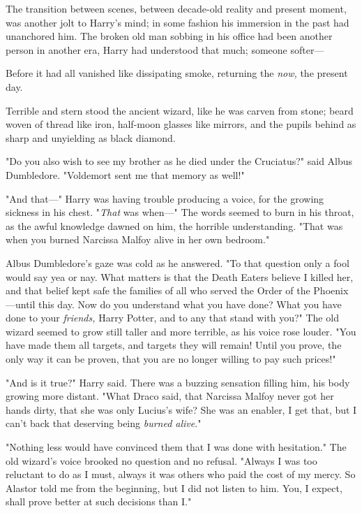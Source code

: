 The transition between scenes, between decade-old reality and present moment, 
was another jolt to Harry's mind; in some fashion his immersion in the past had 
unanchored him. The broken old man sobbing in his office had been another 
person in another era, Harry had understood that much; someone softer---

Before it had all vanished like dissipating smoke, returning the \emph{now,} 
the present day.

Terrible and stern stood the ancient wizard, like he was carven from stone; 
beard woven of thread like iron, half-moon glasses like mirrors, and the pupils 
behind as sharp and unyielding as black diamond.

"Do you also wish to see my brother as he died under the Cruciatus?" said Albus 
Dumbledore. "Voldemort sent me that memory as well!"

"And that---" Harry was having trouble producing a voice, for the growing 
sickness in his chest. "\emph{That} was when---" The words seemed to burn in 
his throat, as the awful knowledge dawned on him, the horrible understanding. 
"That was when you burned Narcissa Malfoy alive in her own bedroom."

Albus Dumbledore's gaze was cold as he answered. "To that question only a fool 
would say yea or nay. What matters is that the Death Eaters believe I killed 
her, and that belief kept safe the families of all who served the Order of the 
Phoenix---until this day. Now do you understand what you have done? What you 
have done to your \emph{friends,} Harry Potter, and to any that stand with 
you?" The old wizard seemed to grow still taller and more terrible, as his 
voice rose louder. "You have made them all targets, and targets they will 
remain! Until you prove, the only way it can be proven, that you are no longer 
willing to pay such prices!"

"And is it true?" Harry said. There was a buzzing sensation filling him, his 
body growing more distant. "What Draco said, that Narcissa Malfoy never got her 
hands dirty, that she was only Lucius's wife? She was an enabler, I get that, 
but I can't back that deserving being \emph{burned alive}."

"Nothing less would have convinced them that I was done with hesitation." The 
old wizard's voice brooked no question and no refusal. "Always I was too 
reluctant to do as I must, always it was others who paid the cost of my mercy. 
So Alastor told me from the beginning, but I did not listen to him. You, I 
expect, shall prove better at such decisions than I."

